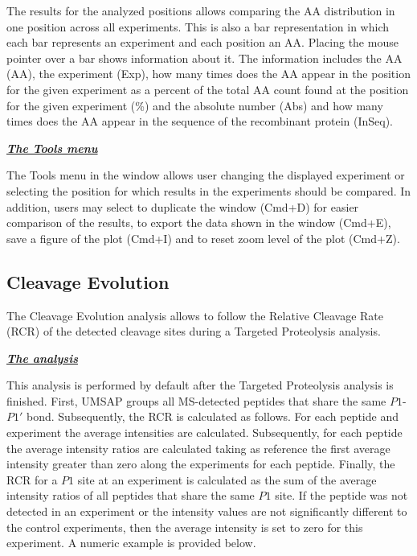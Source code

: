 The results for the analyzed positions allows comparing the AA distribution in one
position across all experiments. This is also a bar representation in which each
bar represents an experiment and each position an AA. Placing the mouse pointer
over a bar shows information about it. The information includes the AA (AA), the
experiment (Exp), how many times does the AA appear in the position for the given
experiment as a percent of the total AA count found at the position for the given
experiment (\%) and the absolute number (Abs) and how many times does the AA appear
in the sequence of the recombinant protein (InSeq).

\textit{\textbf{\underline{The Tools menu}}}

The Tools menu in the window allows user changing the displayed experiment or selecting
the position for which results in the experiments should be compared. In addition,
users may select to duplicate the window (Cmd+D) for easier comparison of the results,
to export the data shown in the window (Cmd+E), save a figure of the plot (Cmd+I)
and to reset zoom level of the plot (Cmd+Z).

\subsection{Cleavage Evolution}
\label{subsec:tarprotCutEvol}

The Cleavage Evolution analysis allows to follow the Relative Cleavage Rate (RCR)
of the detected cleavage sites during a Targeted Proteolysis analysis.

\textit{\textbf{\underline{The analysis}}}

This analysis is performed by default after the Targeted Proteolysis analysis is
finished. First, UMSAP groups all MS-detected peptides that share the same \(P1\)-\(P1'\)
bond. Subsequently, the RCR is calculated as follows. For each
peptide and experiment the average intensities are calculated. Subsequently, for
each peptide the average intensity ratios are calculated taking as reference the
first average intensity greater than zero along the experiments for each peptide.
Finally, the RCR for a \(P1\) site at an experiment is calculated
as the sum of the average intensity ratios of all peptides that share the same \(P1\)
site. If the peptide was not detected in an experiment or the intensity values are
not significantly different to the control experiments, then the average intensity
is set to zero for this experiment. A numeric example is provided below.

